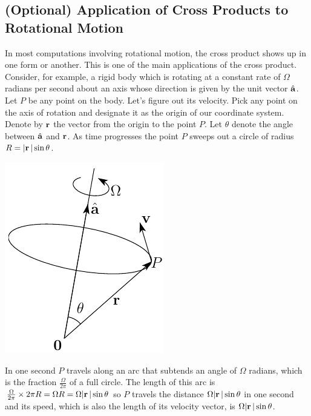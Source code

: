 \subsection{(Optional) Application of Cross Products to Rotational Motion}
\label{sec rot motion}
In most computations involving rotational motion, the cross product shows
up in one form or another. This is one of the main applications of the cross
product. Consider, for example, a rigid body which is rotating 
 at a constant rate of $\Omega$ radians per second about an axis 
whose direction is given by the unit vector $\hat{\mathbf{a}}$. Let $P$ be any point
on the body. Let's figure out its velocity. Pick any point on the axis
of rotation and designate it as the origin of our coordinate system. Denote
by $\mathbf{r}$ the vector from the origin to the point $P$. Let $\theta$ denote
the angle between $\hat{\mathbf{a}}$ and $\mathbf{r}$. As time progresses the point $P$
sweeps out a circle of radius $R=|\mathbf{r}\,|\sin\theta$.
      \begin{efig} 
      \begin{center}
      \includegraphics{rigid}
      \end{center}
      \end{efig}
In one second $P$ travels along an arc that subtends an angle of 
$\Omega$ radians, which is the fraction $\tfrac{\Omega}{2\pi}$ 
of a full circle.  The length of this arc is
$\tfrac{\Omega}{2\pi}\times 2\pi R=\Omega R=\Omega|\mathbf{r}\,|\sin\theta$ so $P$ travels the distance $\Omega|\mathbf{r}\,|\sin\theta$
in one second and its speed, which is also the length of its velocity vector,
is $\Omega|\mathbf{r}\,|\sin\theta$. 

